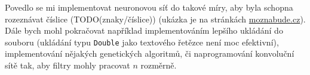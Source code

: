 \documentclass[12pt]{report}			%
\begin{document}
		Povedlo se mi implementovat neuronovou síť do takové míry, aby byla schopna rozeznávat číslice (TODO(znaky/číslice)) (ukázka je na stránkách \url{moznabude.cz}). Dále bych mohl pokračovat například implementováním lepšího ukládání do souboru (ukládání typu \verb!Double! jako textového řetězce není moc efektivní), implementování nějakých genetických algoritmů, či naprogramování konvoluční sítě tak, aby filtry mohly pracovat $n$ rozměrně.
	
	\nocite{*}
    \printbibliography					%
    \printglossary[title={Slovníček pojmů}]	%
    \listoffigures						%
    
    \begin{prilohy}
    \end{prilohy}
\end{document}
